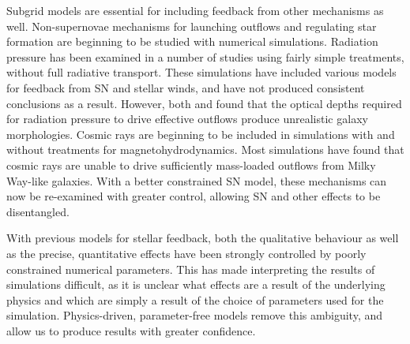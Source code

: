 Subgrid models are essential for including feedback from other mechanisms as
well.  Non-supernovae mechanisms for launching outflows and regulating star
formation are beginning to be studied with numerical simulations.  Radiation
pressure has been examined in a number of studies
\citep{Hopkins2014,Roskar2014,Agertz2015} using fairly simple treatments,
without full radiative transport.  These simulations have included various
models for feedback from SN and stellar winds, and have not produced consistent
conclusions as a result.  However, both \citet{Roskar2014} and
\citet{Agertz2015} found that the optical depths required for radiation pressure
to drive effective outflows produce unrealistic galaxy morphologies.  Cosmic
rays are beginning to be included in simulations with \citep{Girichidis2015} and
without \citep{Jubelgas2008,Booth2013} treatments for magnetohydrodynamics.
Most simulations have found that cosmic rays are unable to drive sufficiently
mass-loaded outflows from Milky Way-like galaxies.  With a better constrained SN
model, these mechanisms can now be re-examined with greater control, allowing SN
and other effects to be disentangled.

With previous models for stellar feedback, both the qualitative behaviour as
well as the precise, quantitative effects have been strongly controlled by
poorly constrained numerical parameters.  This has made interpreting the results
of simulations difficult, as it is unclear what effects are a result of
the underlying physics and which are simply a result of the choice of parameters
used for the simulation.  Physics-driven, parameter-free models remove this
ambiguity, and allow us to produce results with greater confidence.  

